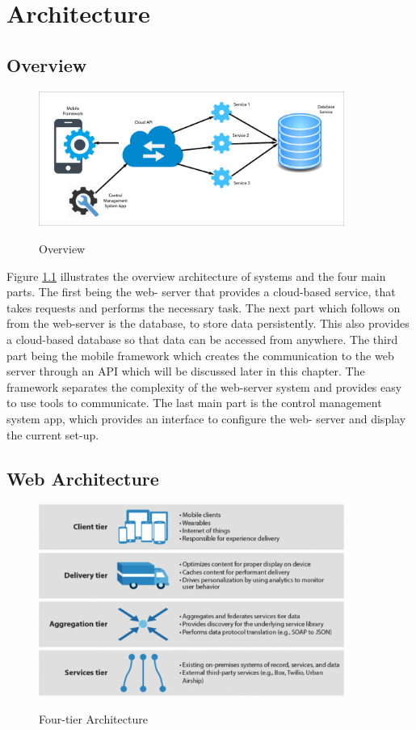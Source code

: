 \chapter{Architecture}

\section{Overview}

\begin{figure}[h]
    \caption{Overview}
    \centering
    \includegraphics[width=100mm]{images/overview}
    \label{fig:label}
\end{figure}

Figure \ref{fig:label} illustrates the overview architecture of systems and the four main parts. The first being the web- server that provides a cloud-based service, that takes requests and performs the necessary task. The next part which follows on from the web-server is the database, to store data persistently. This also provides a cloud-based database so that data can be accessed from anywhere. The third part being the mobile framework which creates the communication to the web server through an API which will be discussed later in this chapter. The framework separates the complexity of the web-server system and provides easy to use tools to communicate. The last main part is the control management system app, which provides an interface to configure the web- server and display the current set-up.

\section{Web Architecture}

\begin{figure}[!h]
    \caption{Four-tier Architecture \cite{ted} }
    \centering
    \includegraphics[width=100mm]{images/four-tier}
    \label{fig:four-tier}
\end{figure}

